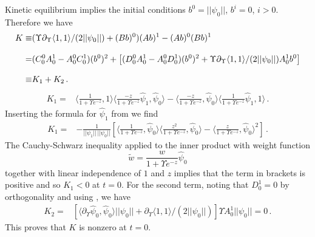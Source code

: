 Kinetic equilibrium implies the initial conditions $b^0=||\psi_0||$, $b^i=0$, $i>0$.  Therefore we have
\begin{align}
K\equiv& (\Upsilon\partial_\Upsilon \langle 1,1\rangle/(2||\psi_0||)+(Bb)^0)(Ab)^1-(Ab)^0(Bb)^1\\[0.3cm]
=&(C^0_0A^1_0-A^0_0C^1_0)(b^0)^2+\left[(D^0_0A^1_0-A^0_0D^1_0)(b^0)^2+\Upsilon\partial_\Upsilon \langle 1,1\rangle/(2||\psi_0||)A^1_0b^0\right]\notag\\[0.3cm]
\equiv & K_1+K_2\,.\notag
\end{align}
\begin{align}
K_1=&\langle \frac{1}{1+\Upsilon e^{-z}},1\rangle\langle \frac{-z}{1+\Upsilon e^{-z}}\hat\psi_1,\hat\psi_0\rangle-\langle\frac{-z}{1+\Upsilon e^{-z}},\hat\psi_0\rangle\langle\frac{1}{1+ \Upsilon e^{-z}}\hat\psi_1,1\rangle\,.
\end{align}
Inserting the formula for $\hat\psi_1$ from  we find
\begin{align}
K_1=&-\frac{1}{||\psi_1||\,||\psi_0||}\left[\langle\frac{1}{1+ \Upsilon e^{-z}},\hat\psi_0\rangle\langle\frac{z^2}{1+\Upsilon e^{-z}},\hat\psi_0\rangle-\langle\frac{z}{1+\Upsilon e^{-z}},\hat\psi_0\rangle^2\right]\,.
\end{align}
The Cauchy-Schwarz inequality  applied to the inner product with weight function
\begin{equation}
\tilde{w}=\frac{w}{1+\Upsilon e^{-z}}\hat\psi_0
\end{equation}
together with linear independence of $1$ and $z$ implies that the term in brackets is positive and so $K_1<0$ at $t=0$.  For the second term, noting that $D^1_0=0$ by orthogonality and using , we have
\begin{align}
K_2=&[\langle\partial_\Upsilon\hat\psi_0,\hat\psi_0\rangle||\psi_0||+\partial_\Upsilon \langle 1,1\rangle/(2||\psi_0||)]\Upsilon A_0^1||\psi_0||=0\,.
\end{align}
This proves that $K$ is nonzero at $t=0$.\\

